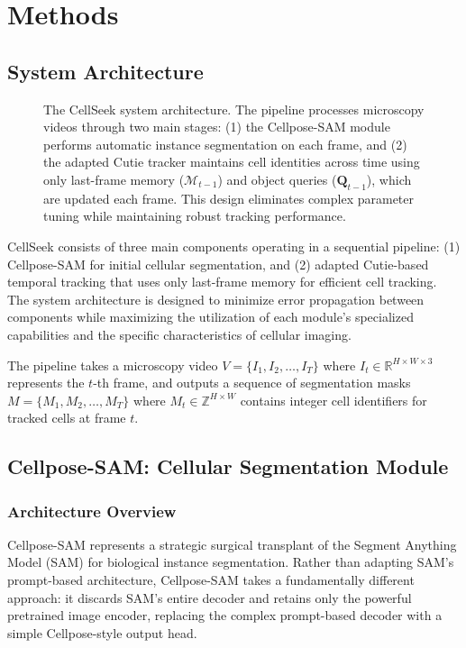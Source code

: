 \documentclass[../cellseek_paper.tex]{subfiles}
\begin{document}
\section{Methods}

\subsection{System Architecture}

\begin{figure}[H]
  \centering
  
  \caption{The CellSeek system architecture. The pipeline processes microscopy videos through two main stages: (1) the Cellpose-SAM module performs automatic instance segmentation on each frame, and (2) the adapted Cutie tracker maintains cell identities across time using only last-frame memory ($\mathcal{M}_{t-1}$) and object queries ($\mathbf{Q}_{t-1}$), which are updated each frame. This design eliminates complex parameter tuning while maintaining robust tracking performance.}
  \label{fig:architecture}
\end{figure}

CellSeek consists of three main components operating in a sequential pipeline: (1) Cellpose-SAM for initial cellular segmentation, and (2) adapted Cutie-based temporal tracking that uses only last-frame memory for efficient cell tracking. The system architecture is designed to minimize error propagation between components while maximizing the utilization of each module's specialized capabilities and the specific characteristics of cellular imaging.

The pipeline takes a microscopy video $V = \{I_1, I_2, \ldots, I_T\}$ where $I_t \in \mathbb{R}^{H \times W \times 3}$ represents the $t$-th frame, and outputs a sequence of segmentation masks $M = \{M_1, M_2, \ldots, M_T\}$ where $M_t \in \mathbb{Z}^{H \times W}$ contains integer cell identifiers for tracked cells at frame $t$.

\subsection{Cellpose-SAM: Cellular Segmentation Module}

\subsubsection{Architecture Overview}

Cellpose-SAM represents a strategic surgical transplant of the Segment Anything Model (SAM) \cite{kirillov2023segment} for biological instance segmentation. Rather than adapting SAM's prompt-based architecture, Cellpose-SAM takes a fundamentally different approach: it discards SAM's entire decoder and retains only the powerful pretrained image encoder, replacing the complex prompt-based decoder with a simple Cellpose-style \cite{stringer2021cellpose} output head.
\end{document}
